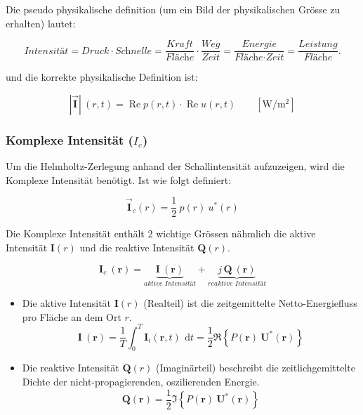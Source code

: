 Die pseudo physikalische definition (um ein Bild der physikalischen Grösse zu erhalten) lautet:

\begin{equation}
\textit{Intensität} = \textit{Druck} \cdot \textit{Schnelle}=\frac{\textit{Kraft}}{\textit{Fläche}} \cdot \frac{\textit{Weg}}{\textit{Zeit}} = \frac{\textit{Energie}}{\textit{Fläche}\cdot \textit{Zeit}} = \frac{\textit{Leistung}}{\textit{Fläche}}.
\label{helmholtz:equationIntensitaetPseudoDef}
\end{equation}

und die korrekte physikalische Definition ist:

\begin{equation}
\mathbf{|\vec{I}|} \:(r ,t)  =  \operatorname{Re}{p(r, t)} \cdot \operatorname{Re}{u(r, t)} \qquad [\si{\W / \square\metre}]
\label{helmholtz:equationIntensitaetMomentan}
\end{equation}


\subsubsection{Komplexe Intensität ($I_c$)}

Um die Helmholtz-Zerlegung anhand der Schallintensität aufzuzeigen, wird die Komplexe Intensität benötigt. Ist wie folgt definiert:

\begin{equation}
\mathbf{\vec{I}}_c (r)  = \frac{1}{2} \:  p(r) \: u^{*}(r) 
\label{helmholtz:equationIntensitaetKomplex}
\end{equation}

Die Komplexe Intensität enthält 2 wichtige Grössen nähmlich die aktive Intensität $\mathbf{I}(r)$ und die reaktive Intensität $\mathbf{Q}(r)$. 

\begin{equation}
	\mathbf{I}_c ~(\mathbf{r}) = \underbrace{\mathbf{I}~(\mathbf{r})}_{\textit{aktive Intensität}} + \underbrace{j\,\mathbf{Q}~(\mathbf{r})}_{\textit{reaktive~Intensität}}
\label{helmholtz:equationIntensitaetKomplex_2}
\end{equation}	

\begin{itemize}
\item Die aktive Intensität $\mathbf{I}(r)$ (Realteil) ist die zeitgemittelte Netto-Energiefluss pro Fläche an dem Ort $r$.
\begin{equation}
	\mathbf{I}~(\mathbf{r}) = \frac{1}{T}\int_0^T \mathbf{I}_i(\mathbf{r},t)\,~\mathrm{d}t = \frac{1}{2}\Re\left\{P(\mathbf{r})~\mathbf{U}^*(\mathbf{r})\right\}
	\end{equation}
\item Die reaktive Intensität $\mathbf{Q}(r)$ (Imaginärteil) beschreibt die zeitlichgemittelte Dichte der nicht-propagierenden, oszilierenden Energie. 
\begin{equation}
	\mathbf{Q}(\mathbf{r}) = \frac{1}{2}\Im\left\{P(\mathbf{r})~\mathbf{U}^*(\mathbf{r})\right\}
	\label{helmholtz:equationReaktiveIntensitaet}
	\end{equation}
\end{itemize}




